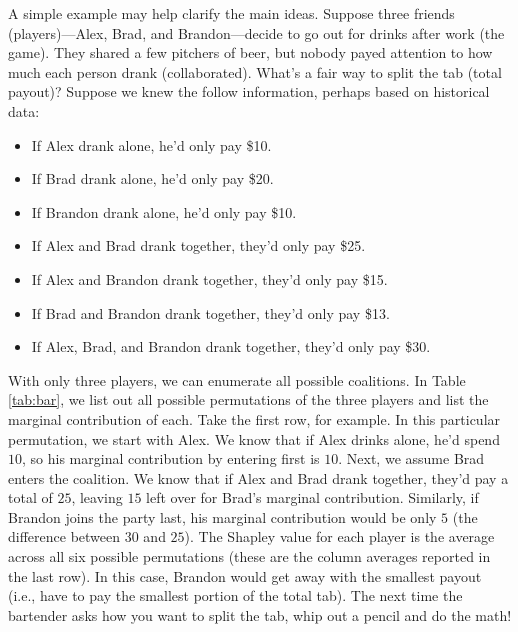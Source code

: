 A simple example may help clarify the main ideas. Suppose three friends
(players)---Alex, Brad, and Brandon---decide to go out for drinks after
work (the game). They shared a few pitchers of beer, but nobody payed
attention to how much each person drank (collaborated). What's a fair
way to split the tab (total payout)? Suppose we knew the follow
information, perhaps based on historical data:

\begin{itemize}

  \item If Alex drank alone, he'd only pay \$10.
  
  \item If Brad drank alone, he'd only pay \$20.
  
  \item If Brandon drank alone, he'd only pay \$10.
  
  \item If Alex and Brad drank together, they'd only pay \$25.
  
  \item If Alex and Brandon drank together, they'd only pay \$15.
  
  \item If Brad and Brandon drank together, they'd only pay \$13.
  
  \item If Alex, Brad, and Brandon drank together, they'd only pay \$30.

\end{itemize}

With only three players, we can enumerate all possible coalitions. In
Table \ref{tab:bar}, we list out all possible permutations of the three
players and list the marginal contribution of each. Take the first row,
for example. In this particular permutation, we start with Alex. We know
that if Alex drinks alone, he'd spend \(10\), so his marginal
contribution by entering first is \(10\). Next, we assume Brad enters
the coalition. We know that if Alex and Brad drank together, they'd pay
a total of \(25\), leaving \(15\) left over for Brad's marginal
contribution. Similarly, if Brandon joins the party last, his marginal
contribution would be only \(5\) (the difference between \(30\) and
\(25\)). The Shapley value for each player is the average across all six
possible permutations (these are the column averages reported in the
last row). In this case, Brandon would get away with the smallest payout
(i.e., have to pay the smallest portion of the total tab). The next time
the bartender asks how you want to split the tab, whip out a pencil and
do the math!

